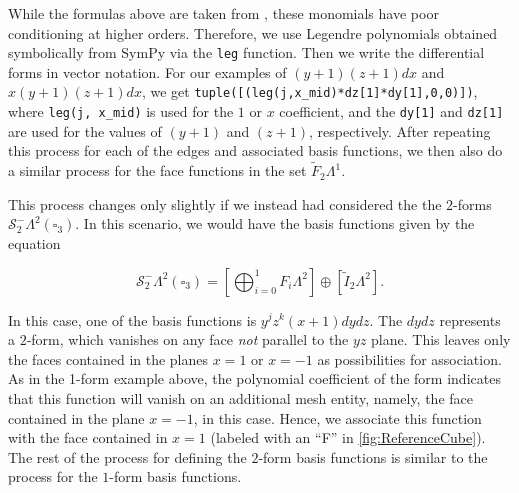 \documentclass[format=acmsmall,screen,timestamp=false,a4paper]{acmart}
\newcommand{\calS}{\mathcal{S}}
\begin{document}
While the formulas above are taken from \citet{gillette2019computational}, these monomials have poor conditioning at higher orders.
Therefore, we use Legendre polynomials obtained symbolically from SymPy via the \texttt{leg} function.  Then we write the differential forms in vector notation.  For our examples of $(y+1)(z+1)dx$ and $x(y+1)(z+1)dx$, we get
\texttt{tuple([(leg(j,x\_mid)*dz[1]*dy[1],0,0)])}, where \texttt{leg(j, x\_mid)} is used for the $1$ or $x$ coefficient, and the \texttt{dy[1]} and \texttt{dz[1]} are used for the values of $(y+1)$ and $(z+1)$, respectively.  After repeating this process for each of the edges and associated basis functions, we then also do a similar process for the face functions in the set $\tilde{F}_2 \Lambda^1$.  

This process changes only slightly if we instead had considered the the $2$-forms $\mathcal{S}^-_2 \Lambda^2(\square_3)$.  In this scenario, we would have the basis functions given by the equation

\begin{equation*}
\calS^-_2\Lambda^2(\square_3) =    \left[\bigoplus_{i=0}^{1} F_i \Lambda^2\right] \oplus \left[\tilde{I}_2 \Lambda^2\right].
\end{equation*}

\noindent In this case, one of the basis functions is $y^jz^k(x+1)dydz$.  The $dydz$ represents a $2$-form, which vanishes on any face \textit{not} parallel to the $yz$ plane.  This leaves only the faces contained in the planes $x=1$ or $x=-1$ as possibilities for association. 
As in the 1-form example above, the polynomial coefficient of the form indicates that this function will vanish on an additional mesh entity, namely, the face contained in the plane $x=-1$, in this case.
Hence, we associate this function with the face contained in $x=1$ (labeled with an ``F'' in \cref{fig:ReferenceCube}).  The rest of the process for defining the $2$-form basis functions is similar to the process for the $1$-form basis functions.
\end{document}

